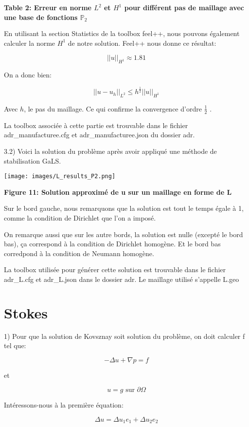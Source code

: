 \documentclass{article}
\begin{document}
\textbf{Table 2: Erreur en norme $L^2$ et $H^1$ pour différent pas de maillage avec une base de fonctions $\mathbb{P}_2$}

En utilisant la section Statistics de la toolbox feel++, nous pouvons également calculer la norme $H^1$ de notre solution. Feel++ nous donne ce résultat:

$$||u||_{H^1} \approx 1.81$$

On a donc bien:

$$||u-u_h||_{L^2} \leq h^{\frac{1}{2}}||u||_{H^1}$$

Avec $h$, le pas du maillage. Ce qui confirme la convergence d'ordre $\frac{1}{2}$ .

La toolbox associée à cette partie est trouvable dans le fichier adr\_manufacturee.cfg et adr\_manufacturee.json du dossier adr.

3.2) Voici la solution du problème après avoir appliqué une méthode de stabilisation GaLS.

\texttt{[image: images/L\_results\_P2.png]}
\begin{center}
    \textbf{Figure 11: Solution approximé de u sur un maillage en forme de L}
\end{center}

Sur le bord gauche, nous remarquons que la solution est tout le temps égale à 1, comme la condition de Dirichlet que l'on a imposé.

On remarque aussi que sur les autre bords, la solution est nulle (excepté le bord bas), ça correspond à la condition de Dirichlet homogène. Et le bord bas corredpond à la condition de Neumann homogène.

La toolbox utilisée pour générer cette solution est trouvable dans le fichier adr\_L.cfg et adr\_L.json dans le dossier adr. Le maillage utilisé s'appelle L.geo

\section{Stokes}

1) Pour que la solution de Kovsznay soit solution du problème, on doit calculer f tel que:

$$- \Delta u + \nabla p = f$$

et 

$$u=g \text{ sur } \partial \Omega$$

Intéressons-nous à la première équation:

$$\Delta u = \Delta u_1 e_1+ \Delta u_2 e_2$$
\end{document}
